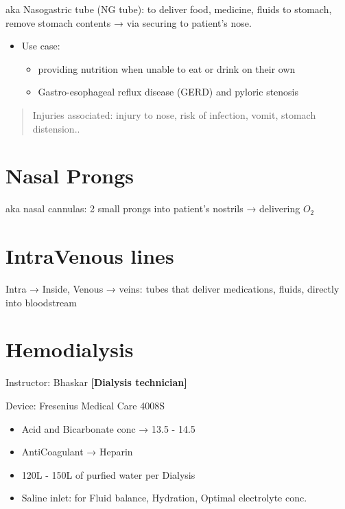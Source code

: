 \documentclass[
  11pt,
  letterpaper,
  DIV=11,
  numbers=noendperiod]{scrreprt}
\providecommand{\tightlist}{%
  \setlength{\itemsep}{0pt}\setlength{\parskip}{0pt}}\usepackage{longtable,booktabs,array}
\begin{document}
aka Nasogastric tube (NG tube): to deliver food, medicine, fluids to
stomach, remove stomach contents → via securing to patient's nose.

\begin{itemize}
\tightlist
\item
  Use case:

  \begin{itemize}
  \tightlist
  \item
    providing nutrition when unable to eat or drink on their own
  \item
    Gastro-esophageal reflux disease (GERD) and pyloric stenosis
  \end{itemize}
\end{itemize}

\begin{quote}
Injuries associated: injury to nose, risk of infection, vomit, stomach
distension..
\end{quote}

\section{Nasal Prongs}\label{nasal-prongs}

aka nasal cannulas: 2 small prongs into patient's nostrils → delivering
\(O_2\)

\section{IntraVenous lines}\label{intravenous-lines}

Intra → Inside, Venous → veins: tubes that deliver medications, fluids,
directly into bloodstream

\section{Hemodialysis}\label{hemodialysis}

Instructor: Bhaskar \textbf{{[}Dialysis technician{]}}

Device: Fresenius Medical Care 4008S

\begin{itemize}
\tightlist
\item
  Acid and Bicarbonate conc → 13.5 - 14.5
\item
  AntiCoagulant → Heparin
\item
  120L - 150L of purfied water per Dialysis
\item
  Saline inlet: for Fluid balance, Hydration, Optimal electrolyte conc.
\end{itemize}
\end{document}
